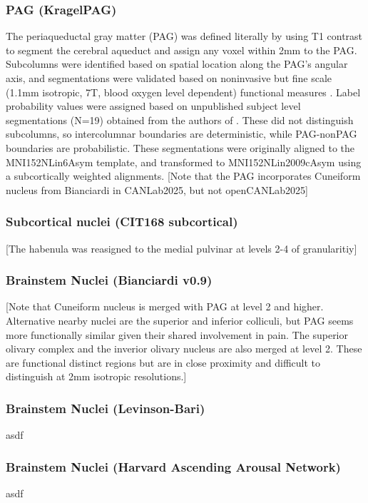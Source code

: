 \documentclass[10pt,letterpaper]{article}
\begin{document}
\subsubsection{PAG (KragelPAG)} The periaqueductal gray matter (PAG) was defined literally by using T1 contrast to segment the cerebral aqueduct and assign any voxel within 2mm to the PAG. Subcolumns were identified based on spatial location along the PAG's angular axis, and segmentations were validated based on noninvasive but fine scale (1.1mm isotropic, 7T, blood oxygen level dependent) functional measures . Label probability values were assigned based on unpublished subject level segmentations (N=19) obtained from the authors of . These did not distinguish subcolumns, so intercolumnar boundaries are deterministic, while PAG-nonPAG boundaries are probabilistic. These segmentations were originally aligned to the MNI152NLin6Asym template, and transformed to MNI152NLin2009cAsym using a subcortically weighted alignments. [Note that the PAG incorporates Cuneiform nucleus from Bianciardi in CANLab2025, but not openCANLab2025]
\\
\subsubsection{Subcortical nuclei (CIT168 subcortical)} [The habenula was reasigned to the medial pulvinar at levels 2-4 of granularitiy]
\\
\subsubsection{Brainstem Nuclei (Bianciardi v0.9)} [Note that Cuneiform nucleus is merged with PAG at level 2 and higher. Alternative nearby nuclei are the superior and inferior colliculi, but PAG seems more functionally similar given their shared involvement in pain. The superior olivary complex and the inverior olivary nucleus are also merged at level 2. These are functional distinct regions but are in close proximity and difficult to distinguish at 2mm isotropic resolutions.]
\\
\subsubsection{Brainstem Nuclei (Levinson-Bari)} asdf
\\
\subsubsection{Brainstem Nuclei (Harvard Ascending Arousal Network)} asdf
\\
\end{document}
